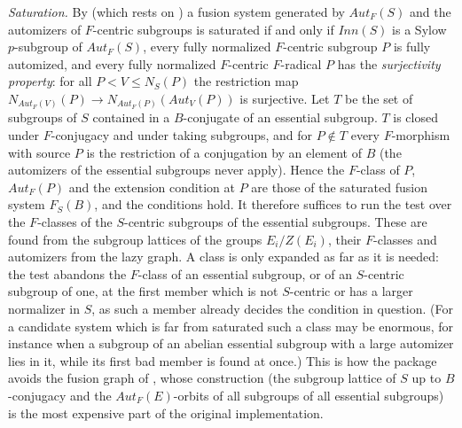 \documentclass[a4paper,11pt]{report}
\begin{document}
{{ \emph{Saturation.} By \cite[Theorem 2.3]{PS21} (which rests on \cite[Theorem 2.2]{BCGLO05}) a fusion system generated by $Aut_F(S)$ and the automizers of $F$-centric subgroups is saturated if and only if $Inn(S)$ is a Sylow $p$-subgroup of $Aut_F(S)$, every fully normalized $F$-centric subgroup $P$ is fully automized, and every fully normalized $F$-centric $F$-radical $P$ has the \emph{surjectivity property}: for all $P < V \le N_S(P)$ the restriction map $N_{Aut_F(V)}(P) \to N_{Aut_F(P)}(Aut_V(P))$ is surjective. Let $T$ be the set of subgroups of $S$ contained in a $B$-conjugate of an essential subgroup. $T$ is closed under $F$-conjugacy and under taking subgroups, and for $P \notin T$ every $F$-morphism with source $P$ is the restriction of a conjugation by an element of $B$ (the automizers of the essential subgroups never apply). Hence the $F$-class of $P$, $Aut_F(P)$ and the extension condition at $P$ are those of the saturated fusion system $F_S(B)$, and the conditions hold. It therefore suffices to run the test over the $F$-classes of the $S$-centric subgroups of the essential subgroups. These are found from the
subgroup lattices of the groups $E_i/Z(E_i)$, their $F$-classes and automizers from the lazy graph. A class is only expanded as far
as it is needed: the test abandons the $F$-class of an essential subgroup, or of an $S$-centric subgroup of one, at the first member which is not $S$-centric or has a larger normalizer in $S$, as such a member already decides the condition in question. (For a candidate
system which is far from saturated such a class may be enormous, for instance
when a subgroup of an abelian essential subgroup with a large automizer lies
in it, while its first bad member is found at once.) This is how the package
avoids the fusion graph of \cite{PS21}, whose construction (the subgroup lattice of $S$ up to $B$-conjugacy and the $Aut_F(E)$-orbits of all subgroups of all essential subgroups) is the most expensive
part of the original implementation. 

}}
\end{document}
